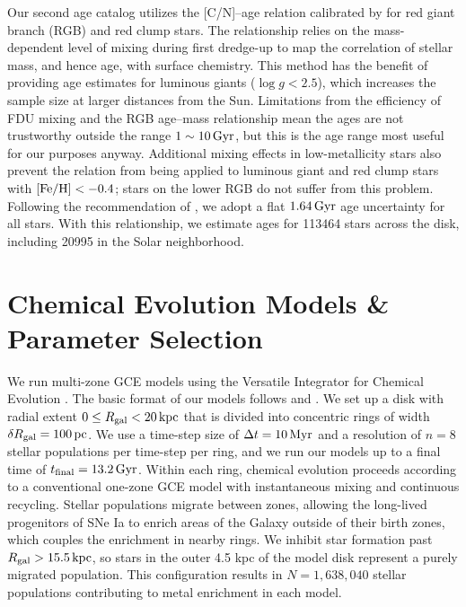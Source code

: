 \documentclass[twocolumn,twocolappendix,linenumbers]{aastex631}
\newcommand{\mathFeH}{{\rm [Fe/H]}}
\newcommand{\kpc}{\,{\rm kpc}}
\newcommand{\Gyr}{\,{\rm Gyr}}
\begin{document}
Our second age catalog utilizes the [C/N]--age relation calibrated by \citet[][submitted]{roberts_cn_2025} for red giant branch (RGB) and red clump stars. The relationship relies on the mass-dependent level of mixing during first dredge-up \citep[FDU;][]{iben_stellar_1967} to map the correlation of stellar mass, and hence age, with surface chemistry. This method has the benefit of providing age estimates for luminous giants ($\log g<2.5$), which increases the sample size at larger distances from the Sun. Limitations from the efficiency of FDU mixing and the RGB age--mass relationship mean the ages are not trustworthy outside the range $1\sim10\Gyr$, but this is the age range most useful for our purposes anyway. Additional mixing effects in low-metallicity stars also prevent the relation from being applied to luminous giant and red clump stars with $\mathFeH<-0.4$; stars on the lower RGB do not suffer from this problem. 
Following the recommendation of \citet[][submitted]{roberts_cn_2025}, we adopt a flat $1.64\Gyr$ age uncertainty for all stars.
With this relationship, we estimate ages for \num{113464} stars across the disk, including \num{20995} in the Solar neighborhood.

\section{Chemical Evolution Models \& Parameter Selection}
\label{sec:methods}

We run multi-zone GCE models using the Versatile Integrator for Chemical Evolution \citep[{\tt VICE};][]{johnson_impact_2020}. The basic format of our models follows \citet{johnson_stellar_2021} and \citet{dubay_galactic_2024}. We set up a disk with radial extent $0\leq R_{\rm gal}<20\kpc$ that is divided into concentric rings of width $\delta R_{\rm gal}=100\,{\rm pc}$. We use a time-step size of $\Delta t=10\,{\rm Myr}$ and a resolution of $n=8$ stellar populations per time-step per ring, and we run our models up to a final time of $t_{\rm final}=13.2\,{\rm Gyr}$. Within each ring, chemical evolution proceeds according to a conventional one-zone GCE model with instantaneous mixing and continuous recycling. Stellar populations migrate between zones, allowing the long-lived progenitors of SNe Ia to enrich areas of the Galaxy outside of their birth zones, which couples the enrichment in nearby rings. We inhibit star formation past $R_{\rm gal}>15.5\kpc$, so stars in the outer 4.5 kpc of the model disk represent a purely migrated population. This configuration results in $N=1,638,040$ stellar populations contributing to metal enrichment in each model.
\end{document}
